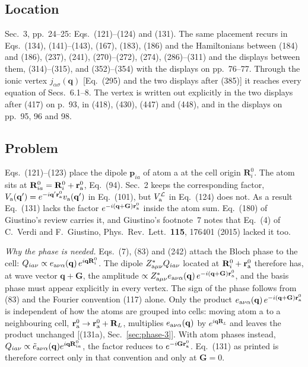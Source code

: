 \documentclass[11pt]{article}
\begin{document}
\subsection{Location}
Sec.~3, pp.~24--25: Eqs.~(121)--(124) and (131). The same placement recurs in Eqs.~(134),
(141)--(143), (167), (183), (186) and the Hamiltonians between (184) and (186), (237), (241),
(270)--(272), (274), (286)--(311) and the displays between them, (314)--(315), and (352)--(354) with
the displays on pp.~76--77. Through the ionic vertex $j_{\alpha\sigma}(\mathbf q)$ [Eq.~(295) and the two
displays after (385)] it reaches every equation of Secs.~6.1--8. The vertex is written out explicitly in
the two displays after (417) on p.~93, in (418), (430), (447) and (448), and in the displays on pp.~95,
96 and 98.

\subsection{Problem}\label{sec:phase-problem}
Eqs.~(121)--(123) place the dipole $\mathbf p_{ia}$ of atom a at the cell origin $\mathbf R^0_i$. The atom
sits at $\mathbf R^0_{ia}=\mathbf R^0_i+\mathbf r^0_{\rm a}$, Eq.~(94). Sec.~2 keeps the corresponding factor,
$V_{\rm a}(\mathbf q')=e^{-i\mathbf q'\mathbf r^0_{\rm a}}v_{\rm a}(\mathbf q')$ in Eq.~(101), but
$V^{\mathcal L}_{\rm a}$ in Eq.~(124) does not. As a result Eq.~(131) lacks the factor
$e^{-i(\mathbf q+\mathbf G)\mathbf r^0_{\rm a}}$ inside the atom sum. Eq.~(180) of Giustino's review carries
it, and Giustino's footnote~7 notes that Eq.~(4) of C.~Verdi and F.~Giustino, Phys.\ Rev.\ Lett.\
\textbf{115}, 176401 (2015) lacked it too.

\emph{Why the phase is needed.} Eqs.~(7), (83) and (242) attach the Bloch phase to the cell:
$Q_{ia\nu}\propto e_{{\rm a}\nu\alpha}(\mathbf q)\,e^{i\mathbf q\mathbf R^0_i}$. The dipole
$Z^*_{{\rm a}\mu\nu}Q_{ia\nu}$ located at $\mathbf R^0_i+\mathbf r^0_{\rm a}$ therefore has, at wave vector
$\mathbf q+\mathbf G$, the amplitude $\propto Z^*_{{\rm a}\mu\nu}e_{{\rm a}\nu\alpha}(\mathbf q)\,
e^{-i(\mathbf q+\mathbf G)\mathbf r^0_{\rm a}}$, and the basis phase must appear explicitly in every vertex.
The sign of the phase follows from (83) and the Fourier convention (117) alone. Only the product
$e_{{\rm a}\nu\alpha}(\mathbf q)\,e^{-i(\mathbf q+\mathbf G)\mathbf r^0_{\rm a}}$ is independent of how the
atoms are grouped into cells: moving atom a to a neighbouring cell, $\mathbf r^0_{\rm a}\to\mathbf r^0_{\rm a}
+\mathbf R_L$, multiplies $e_{{\rm a}\nu\alpha}(\mathbf q)$ by $e^{i\mathbf q\mathbf R_L}$ and leaves the
product unchanged [(131a), Sec.~\ref{sec:phase-3}]. With atom phases instead, $Q_{ia\nu}\propto\tilde e_{{\rm a}\nu\alpha}(\mathbf q)e^{i\mathbf q\mathbf R^0_{ia}}$, the
factor reduces to $e^{-i\mathbf G\mathbf r^0_{\rm a}}$. Eq.~(131) as printed is therefore correct only in
that convention and only at $\mathbf G=0$.
\end{document}
